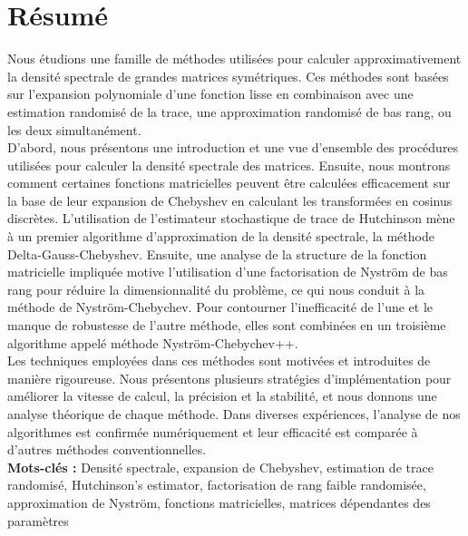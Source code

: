 \chapter*{Résumé}
\label{chp:0-resume}

Nous étudions une famille de méthodes utilisées pour calculer approximativement
la densité spectrale de grandes matrices symétriques. Ces méthodes sont basées
sur l'expansion polynomiale d'une fonction lisse en combinaison avec une estimation randomisé
de la trace, une approximation randomisé de bas rang, ou les deux simultanément.\\

D'abord, nous présentons une introduction et une vue d'ensemble des procédures
utilisées pour calculer la densité spectrale des matrices. Ensuite, nous montrons
comment certaines fonctions matricielles peuvent être calculées efficacement sur
la base de leur expansion de Chebyshev en calculant les transformées en cosinus
discrètes. L'utilisation de l'estimateur stochastique de trace de Hutchinson
mène à un premier algorithme d'approximation de la densité spectrale, la
méthode Delta-Gauss-Chebyshev. Ensuite, une analyse de la structure de la
fonction matricielle impliquée motive l'utilisation d'une factorisation de
Nystr\"om de bas rang pour réduire la dimensionnalité du problème, ce qui
nous conduit à la méthode de Nystr\"om-Chebychev. Pour contourner l'inefficacité
de l'une et le manque de robustesse de l'autre méthode, elles sont combinées en
un troisième algorithme appelé méthode Nystr\"om-Chebychev++.\\

Les techniques employées dans ces méthodes sont motivées et introduites de manière
rigoureuse. Nous présentons plusieurs stratégies d'implémentation pour améliorer
la vitesse de calcul, la précision et la stabilité, et nous donnons une analyse
théorique de chaque méthode. Dans diverses expériences, l'analyse de nos algorithmes
est confirmée numériquement et leur efficacité est comparée à d'autres méthodes
conventionnelles.\\

\textbf{Mots-clés :} Densité spectrale, expansion de Chebyshev, estimation de trace randomisé,
Hutchinson's estimator, factorisation de rang faible randomisée, approximation de Nystr\"om,
fonctions matricielles, matrices dépendantes des paramètres

